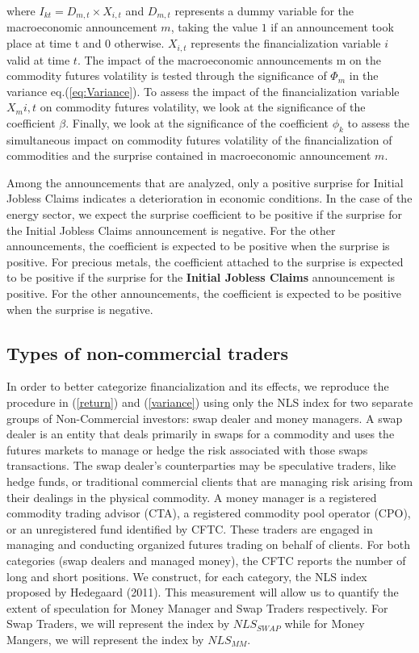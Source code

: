 \documentclass[12pt]{article}
\begin{document}
where $I_{kt}=D_{m,t} \times X_{i,t}$ and $D_{m,t}$ represents a dummy variable for the macroeconomic announcement $m$, taking the value $1$ if an announcement took place at time t and 0 otherwise. $X_{i,t}$  represents the financialization variable $i$ valid at time $t$. The impact of the macroeconomic announcements m on the commodity futures volatility is tested through the significance of $\Phi_m$ in the variance eq.(\ref{eq:Variance}). To assess the impact of the financialization variable $X_m{i,t}$ on commodity futures volatility, we look at the significance of the coefficient $\beta$. Finally, we look at the significance of the coefficient $\phi_k$ to assess the simultaneous impact on commodity futures volatility of the financialization of commodities and the surprise contained in macroeconomic announcement $m$. 

Among the announcements that are analyzed, only a positive surprise for Initial Jobless Claims indicates a deterioration in economic conditions. In the case of the energy sector, we expect the surprise coefficient to be positive if the surprise for the Initial Jobless Claims announcement is negative. For the other announcements, the coefficient is expected to be positive when the surprise is positive. For precious metals, the coefficient attached to the surprise is expected to be positive if the surprise for the \textbf{Initial Jobless Claims} announcement is positive. For the other announcements, the coefficient is expected to be positive when the surprise is negative.

\subsection{Types of non-commercial traders}
In order to better categorize financialization and its effects, we reproduce the procedure in (\ref{return})  and (\ref{variance}) using only the NLS index for two separate groups of Non-Commercial investors: swap dealer and money managers. A swap dealer is an entity that deals primarily in swaps for a commodity and uses the futures markets to manage or hedge the risk associated with those swaps transactions. The swap dealer’s counterparties may be speculative traders, like hedge funds, or traditional commercial clients that are managing risk arising from their dealings in the physical commodity. A money manager is a registered commodity trading advisor (CTA), a registered commodity pool operator (CPO), or an unregistered fund identified by CFTC. These traders are engaged in managing and conducting organized futures trading on behalf of clients. For both categories (swap dealers and managed money), the CFTC reports the number of long and short positions. We construct, for each category, the NLS index proposed by Hedegaard (2011). This measurement will allow us to quantify the extent of speculation for Money Manager and Swap Traders respectively. For Swap Traders, we will represent the index by $NLS_{SWAP}$ while for Money Mangers, we will represent the index by $NLS_{MM}$.
\end{document}
